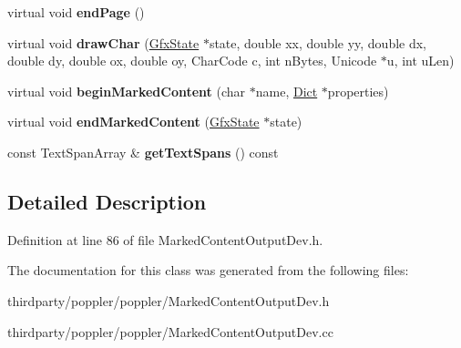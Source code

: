 \begin{DoxyCompactItemize}
virtual void {\bfseries end\+Page} ()
\item 
\mbox{\label{class_marked_content_output_dev_a3032ed72ea09aacf7664c400949e440c}} 
virtual void {\bfseries draw\+Char} (\hyperlink{class_gfx_state}{Gfx\+State} $\ast$state, double xx, double yy, double dx, double dy, double ox, double oy, Char\+Code c, int n\+Bytes, Unicode $\ast$u, int u\+Len)
\item 
\mbox{\label{class_marked_content_output_dev_aa2a2169bfea9a73b13fca5cde709c737}} 
virtual void {\bfseries begin\+Marked\+Content} (char $\ast$name, \hyperlink{class_dict}{Dict} $\ast$properties)
\item 
\mbox{\label{class_marked_content_output_dev_aa811929db68455a319424f54587fa64e}} 
virtual void {\bfseries end\+Marked\+Content} (\hyperlink{class_gfx_state}{Gfx\+State} $\ast$state)
\item 
\mbox{\label{class_marked_content_output_dev_a481bf46c6e45b093627ea05cf916c131}} 
const Text\+Span\+Array \& {\bfseries get\+Text\+Spans} () const
\end{DoxyCompactItemize}


\subsection{Detailed Description}


Definition at line 86 of file Marked\+Content\+Output\+Dev.\+h.



The documentation for this class was generated from the following files\+:\begin{DoxyCompactItemize}
\item 
thirdparty/poppler/poppler/Marked\+Content\+Output\+Dev.\+h\item 
thirdparty/poppler/poppler/Marked\+Content\+Output\+Dev.\+cc\end{DoxyCompactItemize}
